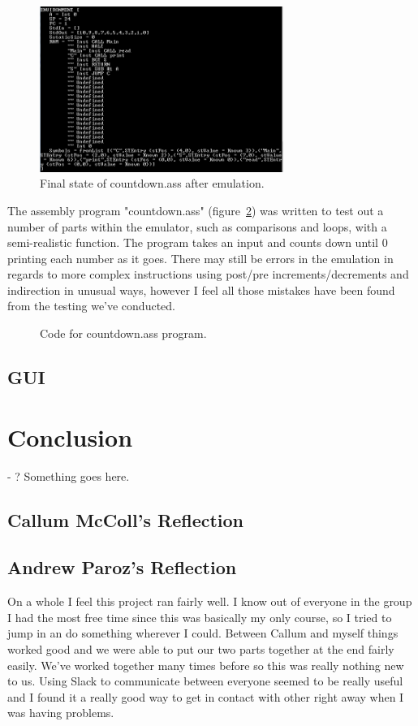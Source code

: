 \documentclass[10point]{article}
\begin{document}
\begin{figure}[h]
    \centering
    \includegraphics[width=300px]{EmulationResult}
    \caption{Final state of countdown.ass after emulation.}
    \label{fig:EmulationResult}
\end{figure}

The assembly program "countdown.ass" (figure~\ref{fig:CountdownCode}) was written to test out a number of parts within the emulator, such as comparisons and loops, with a semi-realistic function. The program takes an input and counts down until 0 printing each number as it goes. There may still be errors in the emulation in regards to more complex instructions using post/pre increments/decrements and indirection in unusual ways, however I feel all those mistakes have been found from the testing we've conducted.

\begin{figure}[h]
    \caption{Code for countdown.ass program.}
    \label{fig:CountdownCode}
\end{figure}

\subsection{GUI}

\section{Conclusion}
- ? Something goes here.

\subsection{Callum McColl's Reflection}

\subsection{Andrew Paroz's Reflection}
On a whole I feel this project ran fairly well. I know out of everyone in the group I had the most free time since this was basically my only course, so I tried to jump in an do something wherever I could. Between Callum and myself things worked good and we were able to put our two parts together at the end fairly easily. We've worked together many times before so this was really nothing new to us. Using Slack to communicate between everyone seemed to be really useful and I found it a really good way to get in contact with other right away when I was having problems.
\end{document}

